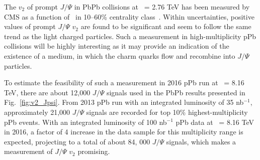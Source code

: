 The $v_2$ of prompt $J/\Psi$ in PbPb collisions at \rootsNN\ = 2.76 TeV has been measured by CMS
as a function of \pt\ in 10--60\% centrality class~\cite{CMS-PAS-HIN-12-001}. Within uncertainties,
positive values of prompt $J/\Psi$ $v_2$ are found to be significant and seem to follow the same trend
as the light charged particles. Such a measurement in high-multiplicity pPb collisions will be highly interesting as it may provide an indication of the existence of a medium, in which the charm quarks flow and
recombine into $J/\Psi$ particles. 

To estimate the feasibility of such a measurement in 2016 pPb run at \rootsNN\ = 8.16 TeV, 
there are about 12,000 $J/\Psi$ signals used in the PbPb results presented in Fig.~\ref{fig:v2_Jpsi}.
From 2013 pPb run with an integrated luminosity of 35 nb$^{-1}$, approximately 21,000 $J/\Psi$ signals
are recorded for top 10\% highest-multiplicity pPb events. With an integrated luminosity of 100 nb$^{-1}$
pPb data at \rootsNN\ = 8.16 TeV in 2016, a factor of 4 increase in the data sample 
for this multiplicity range is expected, projecting to a total of about 84, 000 $J/\Psi$ signals, which
makes a measurement of $J/\Psi$ $v_2$ promising.

\clearpage